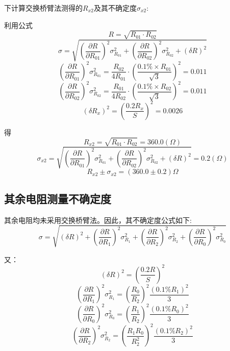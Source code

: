 \documentclass{ctexart}
\begin{document}
 
 下计算交换桥臂法测得的$R_{x2}$及其不确定度$\sigma_{x2}$:
 
 利用公式$$R=\sqrt{R_{01}\cdot R_{02}}$$
$$\sigma=\sqrt{(\frac{\partial R}{\partial R_{01}})^2\sigma_{R_{01}}^2+(\frac{\partial R}{\partial R_{02}})^2\sigma_{R_{02}}^2+(\delta R)^2}$$
$$(\frac{\partial R}{\partial R_{01}})^2\sigma_{R_{01}}^2=\frac{R_{02}}{4R_{01}}\cdot (\frac{0.1\% \times R_{01}}{\sqrt{3}})^2=0.011$$
$$(\frac{\partial R}{\partial R_{02}})^2\sigma_{R_{02}}^2=\frac{R_{01}}{4R_{02}}\cdot (\frac{0.1\% \times R_{02}}{\sqrt{3}})^2=0.011$$
$$(\delta R_x)^2=(\frac{0.2R_x}{S})^2=0.0026$$

得
$$R_{x2}=\sqrt{R_{01}\cdot R_{02}}=360.0(\Omega)$$
$$\sigma_{x2}=\sqrt{(\frac{\partial R}{\partial R_{01}})^2\sigma_{R_{01}}^2+(\frac{\partial R}{\partial R_{02}})^2\sigma_{R_{02}}^2+(\delta R)^2}=0.2(\Omega)$$
$$R_{x2}\pm\sigma_{x2}=(360.0\pm0.2)\Omega$$
\subsection{其余电阻测量不确定度}
其余电阻均未采用交换桥臂法。因此，其不确定度公式如下:$$\sigma=\sqrt{(\delta R)^2+(\frac{\partial R}{\partial R_{1}})^2\sigma_{R_{1}}^2+(\frac{\partial R}{\partial R_{2}})^2\sigma_{R_{2}}^2+(\frac{\partial R}{\partial R_{0}})^2\sigma_{R_{0}}^2}$$

又：
$$(\delta R)^2=(\frac{0.2R}{S})^2$$
$$(\frac{\partial R}{\partial R_{1}})^2\sigma_{R_{1}}^2=(\frac{R_0}{R_2})^2\frac{(0.1\% R_1)^2}{3}$$
$$(\frac{\partial R}{\partial R_{0}})^2\sigma_{R_{0}}^2=(\frac{R_1}{R_2})^2\frac{(0.1\% R_0)^2}{3}$$
$$(\frac{\partial R}{\partial R_{2}})^2\sigma_{R_{2}}^2=(\frac{R_1R_0}{R_2^2})^2\frac{(0.1\% R_2)^2}{3}$$
\end{document}
